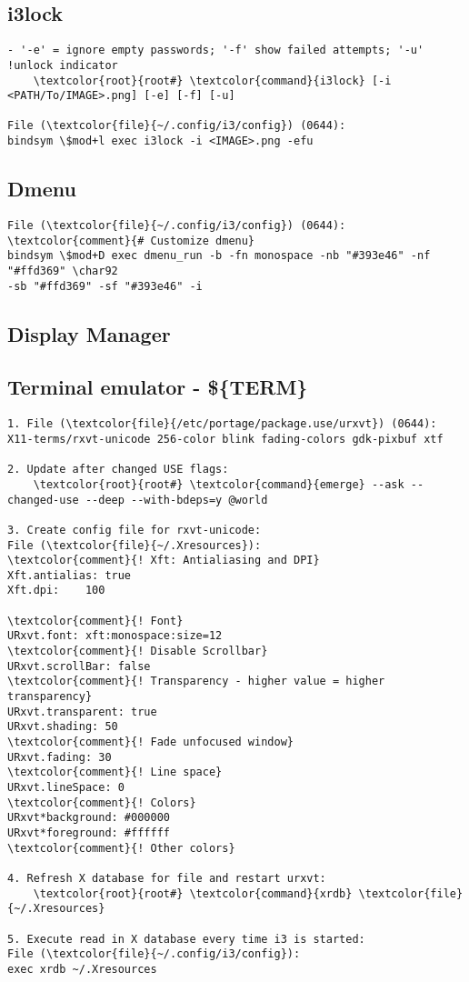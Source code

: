 \documentclass[10pt, a4paper, onecolumn, openany]{book}         %
\begin{document}
\subsection{i3lock}
\begin{Verbatim}[commandchars=\\\{\}]
- '-e' = ignore empty passwords; '-f' show failed attempts; '-u' !unlock indicator
    \textcolor{root}{root#} \textcolor{command}{i3lock} [-i <PATH/To/IMAGE>.png] [-e] [-f] [-u]
    
File (\textcolor{file}{~/.config/i3/config}) (0644):
bindsym \$mod+l exec i3lock -i <IMAGE>.png -efu
\end{Verbatim}



\subsection{Dmenu}
\begin{Verbatim}[commandchars=\\\{\}]
File (\textcolor{file}{~/.config/i3/config}) (0644):
\textcolor{comment}{# Customize dmenu}
bindsym \$mod+D exec dmenu_run -b -fn monospace -nb "#393e46" -nf "#ffd369" \char92
-sb "#ffd369" -sf "#393e46" -i
\end{Verbatim}
\subsection{Display Manager}


\subsection{Terminal emulator - \$\{TERM\}}
\begin{Verbatim}[commandchars=\\\{\}]
1. File (\textcolor{file}{/etc/portage/package.use/urxvt}) (0644):
X11-terms/rxvt-unicode 256-color blink fading-colors gdk-pixbuf xtf

2. Update after changed USE flags:
    \textcolor{root}{root#} \textcolor{command}{emerge} --ask --changed-use --deep --with-bdeps=y @world

3. Create config file for rxvt-unicode:
File (\textcolor{file}{~/.Xresources}):
\textcolor{comment}{! Xft: Antialiasing and DPI}
Xft.antialias: true
Xft.dpi:    100

\textcolor{comment}{! Font}
URxvt.font: xft:monospace:size=12
\textcolor{comment}{! Disable Scrollbar}
URxvt.scrollBar: false
\textcolor{comment}{! Transparency - higher value = higher transparency}
URxvt.transparent: true
URxvt.shading: 50
\textcolor{comment}{! Fade unfocused window}
URxvt.fading: 30
\textcolor{comment}{! Line space}
URxvt.lineSpace: 0
\textcolor{comment}{! Colors}
URxvt*background: #000000
URxvt*foreground: #ffffff
\textcolor{comment}{! Other colors}

4. Refresh X database for file and restart urxvt:
    \textcolor{root}{root#} \textcolor{command}{xrdb} \textcolor{file}{~/.Xresources}
    
5. Execute read in X database every time i3 is started:
File (\textcolor{file}{~/.config/i3/config}):
exec xrdb ~/.Xresources
\end{Verbatim}
\end{document}
